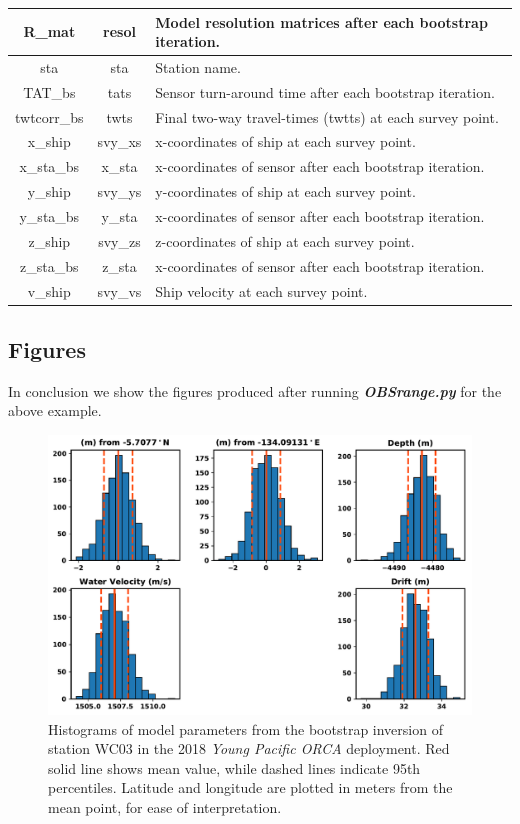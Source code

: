 \documentclass[titlepage, 12pt]{article}
\begin{document}
\begin{table}[!htb]
\begin{tabularx}{\linewidth}{|c|c|X|}
    R\_mat          & resol      & Model resolution matrices after each bootstrap iteration. \\ \hline
    sta             & sta        & Station name. \\ \hline
    TAT\_bs         & tats       & Sensor turn-around time after each bootstrap iteration. \\ \hline
    twtcorr\_bs     & twts       & Final two-way travel-times (twtts) at each survey point. \\ \hline
    x\_ship         & svy\_xs    & x-coordinates of ship at each survey point. \\ \hline
    x\_sta\_bs      & x\_sta     & x-coordinates of sensor after each bootstrap iteration. \\ \hline
    y\_ship         & svy\_ys    & y-coordinates of ship at each survey point. \\ \hline
    y\_sta\_bs      & y\_sta     & x-coordinates of sensor after each bootstrap iteration. \\ \hline
    z\_ship         & svy\_zs    & z-coordinates of ship at each survey point. \\ \hline
    z\_sta\_bs      & z\_sta     & x-coordinates of sensor after each bootstrap iteration. \\ \hline
    v\_ship         & svy\_vs    & Ship velocity at each survey point. \\ \hline
    \end{tabularx}
   \end{table}
  
  \newpage

  \subsection{Figures}
  In conclusion we show the figures produced after running \textit{\textbf{OBSrange.py}} for the above example.

  \begin{figure}[!htb]
   \centering
   \includegraphics[width=0.8\linewidth]{histograms.pdf}
   \caption{Histograms of model parameters from the bootstrap inversion of station WC03 in the 2018 \textit{Young Pacific ORCA} deployment. Red solid line shows mean value, while dashed lines indicate 95th percentiles. Latitude and longitude are plotted in meters from the mean point, for ease of interpretation.}
  \end{figure}
\end{document}
